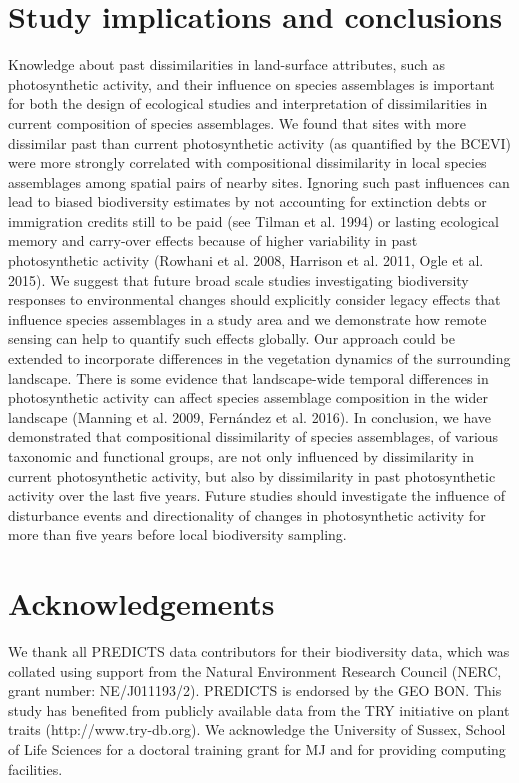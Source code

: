 {\section{Study implications and conclusions}
Knowledge about past dissimilarities in land-surface attributes, such as photosynthetic activity, and their influence on species assemblages is important for both the design of ecological studies and interpretation of dissimilarities in current composition of species assemblages. We found that sites with more dissimilar past than current photosynthetic activity (as quantified by the BCEVI) were more strongly correlated with compositional dissimilarity in local species assemblages among spatial pairs of nearby sites. Ignoring such past influences can lead to biased biodiversity estimates by not accounting for extinction debts or immigration credits still to be paid (see Tilman et al. 1994) or lasting ecological memory and carry-over effects because of higher variability in past photosynthetic activity (Rowhani et al. 2008, Harrison et al. 2011, Ogle et al. 2015). We suggest that future broad scale studies investigating biodiversity responses to environmental changes should explicitly consider legacy effects that influence species assemblages in a study area and we demonstrate how remote sensing can help to quantify such effects globally. Our approach could be extended to incorporate differences in the vegetation dynamics of the surrounding landscape. There is some evidence that landscape-wide temporal differences in photosynthetic activity can affect species assemblage composition in the wider landscape (Manning et al. 2009, Fernández et al. 2016). In conclusion, we have demonstrated that compositional dissimilarity of species assemblages, of various taxonomic and functional groups, are not only influenced by dissimilarity in current photosynthetic activity, but also by dissimilarity in past photosynthetic activity over the last five years. Future studies should investigate the influence of disturbance events and directionality of changes in photosynthetic activity for more than five years before local biodiversity sampling.

\section{Acknowledgements}
We thank all PREDICTS data contributors for their biodiversity data, which was collated using support from the Natural Environment Research Council (NERC, grant number: NE/J011193/2). PREDICTS is endorsed by the GEO BON. This study has benefited from publicly available data from the TRY initiative on plant traits (http://www.try-db.org). We acknowledge the University of Sussex, School of Life Sciences for a doctoral training grant for MJ and for providing computing facilities.

}
